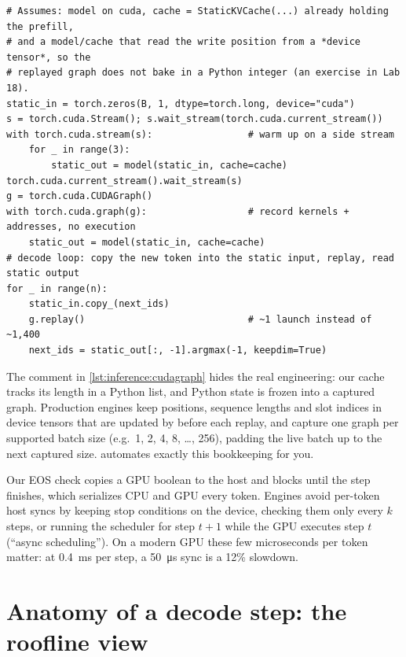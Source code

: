 \begin{lstlisting}[caption={Capturing one static-cache decode step in a CUDA graph (GPU only).},label={lst:inference:cudagraph}]
# Assumes: model on cuda, cache = StaticKVCache(...) already holding the prefill,
# and a model/cache that read the write position from a *device tensor*, so the
# replayed graph does not bake in a Python integer (an exercise in Lab 18).
static_in = torch.zeros(B, 1, dtype=torch.long, device="cuda")
s = torch.cuda.Stream(); s.wait_stream(torch.cuda.current_stream())
with torch.cuda.stream(s):                 # warm up on a side stream
    for _ in range(3):
        static_out = model(static_in, cache=cache)
torch.cuda.current_stream().wait_stream(s)
g = torch.cuda.CUDAGraph()
with torch.cuda.graph(g):                  # record kernels + addresses, no execution
    static_out = model(static_in, cache=cache)
# decode loop: copy the new token into the static input, replay, read static output
for _ in range(n):
    static_in.copy_(next_ids)
    g.replay()                             # ~1 launch instead of ~1,400
    next_ids = static_out[:, -1].argmax(-1, keepdim=True)
\end{lstlisting}

The comment in \cref{lst:inference:cudagraph} hides the real engineering: our cache tracks its
length in a Python list, and Python state is frozen into a captured graph. Production engines keep
positions, sequence lengths and slot indices in device tensors that are updated by 
before each replay, and capture one graph per supported batch size (e.g.\ 1, 2, 4, 8, \ldots, 256),
padding the live batch up to the next captured size. 
automates exactly this bookkeeping for you.

\begin{systemslens}
Our EOS check  copies a GPU boolean to the host and blocks
until the step finishes, which serializes CPU and GPU every token. Engines avoid per-token host
syncs by keeping stop conditions on the device, checking them only every $k$ steps, or running
the scheduler for step $t+1$ while the GPU executes step $t$ (``async scheduling''). On a modern GPU
these few microseconds per token matter: at \SI{0.4}{ms} per step, a \SI{50}{\micro s} sync is a
12\% slowdown.
\end{systemslens}

\section{Anatomy of a decode step: the roofline view}\label{sec:inference:roofline}


